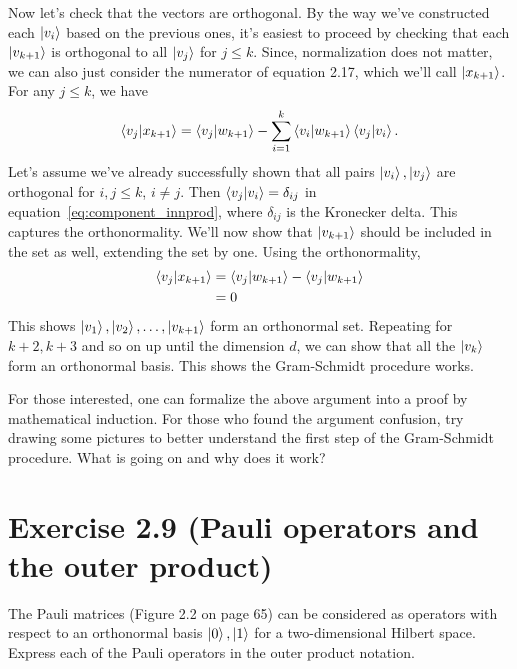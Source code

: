\documentclass{book}
\begin{document}
    Now let's check that the vectors are orthogonal. By the way we've constructed each $\ket{v_i}$ based on the previous ones, it's easiest to proceed by checking that each $\ket{v_{k+1}}$ is orthogonal to all $\ket{v_j}$ for $j \leq k$. Since, normalization does not matter, we can also just consider the numerator of equation 2.17, which we'll call $\ket{x_{k+1}}$. For any $j \leq k$, we have
    \begin{align}\label{eq:component_innprod}
        \braket{v_j}{x_{k+1}} = \braket{v_j}{w_{k+1}} - \sum_{i=1}^k \braket{v_i}{w_{k+1}} \braket{v_j}{v_i}.
    \end{align}
    Let's assume we've already successfully shown that all pairs $\ket{v_i}, \ket{v_j}$ are orthogonal for $i,j \leq k$, $i\neq j$. Then $\braket{v_j}{v_i} = \delta_{ij}$ in equation~\eqref{eq:component_innprod}, where $\delta_{ij}$ is the Kronecker delta. This captures the orthonormality. We'll now show that $\ket{v_{k+1}}$ should be included in the set as well, extending the set by one. Using the orthonormality,
    \begin{align}
    \begin{aligned}
        \braket{v_j}{x_{k+1}} &= \braket{v_j}{w_{k+1}} - \braket{v_j}{w_{k+1}} \\
        &= 0 
    \end{aligned}
    \end{align}
    This shows $\ket{v_1}, \ket{v_2}, \dots, \ket{v_{k+1}}$ form an orthonormal set. Repeating for $k+2, k+3$ and so on up until the dimension $d$, we can show that all the $\ket{v_k}$ form an orthonormal basis. This shows the Gram-Schmidt procedure works.
    
    For those interested, one can formalize the above argument into a proof by mathematical induction. For those who found the argument confusion, try drawing some pictures to better understand the first step of the Gram-Schmidt procedure. What is going on and why does it work?
    
\section*{Exercise 2.9 (Pauli operators and the outer product)}
    The Pauli matrices (Figure 2.2 on page 65) can be considered as operators with respect to an orthonormal basis $\ket{0}, \ket{1}$ for a two-dimensional Hilbert space. Express each of the Pauli operators in the outer product notation.
    
\end{document}
